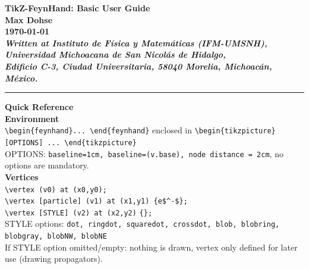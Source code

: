 \documentclass[10pt,letterpaper,twoside,notitlepage]{article}
\numberwithin{figure}{section}
\begin{document}
%
%
%
\thispagestyle{empty}
%
\begin{centering}
	\Large\bfseries%
	TikZ-FeynHand: Basic User Guide%
	\vspace{1mm}\\
	\large\mdseries%
	Max Dohse%
	\vspace{1mm}\\
	\normalsize%
	\today
	\vspace{1mm}\\
	\small\itshape
	Written at Instituto de F\'isica y Matem\'aticas (IFM-UMSNH),
	Universidad Michoacana de San Nicol\'as de Hidalgo,\\
	Edificio C-3, Ciudad Universitaria, 
	58040 Morelia, Michoac\'an, M\'exico.
	\vspace{1.5mm}\\
\end{centering}
%
%
\hrule
\vspace{3mm}
{\centering\Large\bfseries Quick Reference\vspace{-2mm}\\}
%
\noindent
\textbf{Environment}\\
\vercol\verb!\begin{feynhand}... \end{feynhand}!\txcol
enclosed in \vercol\verb!\begin{tikzpicture}[OPTIONS] ... \end{tikzpicture}!\txcol\\
OPTIONS: \vercol\verb!baseline=1cm, baseline=(v.base), node distance = 2cm!\txcol,
no options are mandatory.
\vspace{1.5mm}\\
%
\noindent
\textbf{Vertices}\\
\blucol\verb!\vertex (v0) at (x0,y0);!\txcol\\
\blucol\verb!\vertex [particle] (v1) at (x1,y1) {e$^-$};!\txcol\\
\blucol\verb!\vertex [STYLE] (v2) at (x2,y2)! \redcol\verb!{}!\blucol\verb!;!\txcol\\
STYLE options: \blucol\verb!dot, ringdot, squaredot, crossdot, blob, blobring, blobgray, blobNW, blobNE!\txcol\\
If STYLE option omitted/empty: nothing is drawn, vertex only defined for later use (drawing propagators).
\vspace{1.5mm}\\
\end{document}
